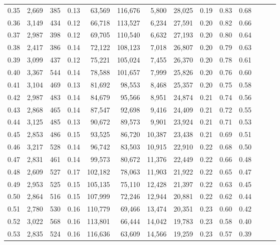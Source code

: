\begin{tabular}{rrrrrrrrrrrrrr}
0.35 &  2,669 &  385 &  0.13 &   63,569 &  116,676 &   5,800 &  28,025 &  0.19 &  0.83 &      0.68 \\
0.36 &  3,149 &  434 &  0.12 &   66,718 &  113,527 &   6,234 &  27,591 &  0.20 &  0.82 &      0.66 \\
0.37 &  2,987 &  398 &  0.12 &   69,705 &  110,540 &   6,632 &  27,193 &  0.20 &  0.80 &      0.64 \\
0.38 &  2,417 &  386 &  0.14 &   72,122 &  108,123 &   7,018 &  26,807 &  0.20 &  0.79 &      0.63 \\
0.39 &  3,099 &  437 &  0.12 &   75,221 &  105,024 &   7,455 &  26,370 &  0.20 &  0.78 &      0.61 \\
0.40 &  3,367 &  544 &  0.14 &   78,588 &  101,657 &   7,999 &  25,826 &  0.20 &  0.76 &      0.60 \\
0.41 &  3,104 &  469 &  0.13 &   81,692 &   98,553 &   8,468 &  25,357 &  0.20 &  0.75 &      0.58 \\
0.42 &  2,987 &  483 &  0.14 &   84,679 &   95,566 &   8,951 &  24,874 &  0.21 &  0.74 &      0.56 \\
0.43 &  2,868 &  465 &  0.14 &   87,547 &   92,698 &   9,416 &  24,409 &  0.21 &  0.72 &      0.55 \\
0.44 &  3,125 &  485 &  0.13 &   90,672 &   89,573 &   9,901 &  23,924 &  0.21 &  0.71 &      0.53 \\
0.45 &  2,853 &  486 &  0.15 &   93,525 &   86,720 &  10,387 &  23,438 &  0.21 &  0.69 &      0.51 \\
0.46 &  3,217 &  528 &  0.14 &   96,742 &   83,503 &  10,915 &  22,910 &  0.22 &  0.68 &      0.50 \\
0.47 &  2,831 &  461 &  0.14 &   99,573 &   80,672 &  11,376 &  22,449 &  0.22 &  0.66 &      0.48 \\
0.48 &  2,609 &  527 &  0.17 &  102,182 &   78,063 &  11,903 &  21,922 &  0.22 &  0.65 &      0.47 \\
0.49 &  2,953 &  525 &  0.15 &  105,135 &   75,110 &  12,428 &  21,397 &  0.22 &  0.63 &      0.45 \\
0.50 &  2,864 &  516 &  0.15 &  107,999 &   72,246 &  12,944 &  20,881 &  0.22 &  0.62 &      0.44 \\
0.51 &  2,780 &  530 &  0.16 &  110,779 &   69,466 &  13,474 &  20,351 &  0.23 &  0.60 &      0.42 \\
0.52 &  3,022 &  568 &  0.16 &  113,801 &   66,444 &  14,042 &  19,783 &  0.23 &  0.58 &      0.40 \\
0.53 &  2,835 &  524 &  0.16 &  116,636 &   63,609 &  14,566 &  19,259 &  0.23 &  0.57 &      0.39 \\

\end{tabular}

